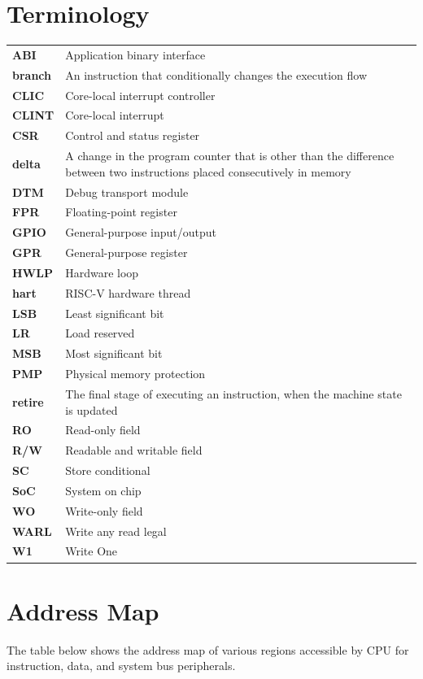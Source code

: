 \documentclass[main\_\_EN.tex]{subfiles}
\begin{document}
\section{Terminology}

\begin{longtable}[c]{ R{2cm} p{12cm} }
\textbf{ABI} & Application binary interface\\
\textbf{branch} & An instruction that conditionally changes the execution flow \\
\textbf{CLIC} & Core-local interrupt controller\\
\textbf{CLINT} & Core-local interrupt\\
\textbf{CSR} & Control and status register\\
\textbf{delta} & A change in the program counter that is other than the difference between two instructions placed consecutively in memory \\
\textbf{DTM} & Debug transport module \\
\textbf{FPR} & Floating-point register\\
\textbf{GPIO} & General-purpose input/output\\
\textbf{GPR} & General-purpose register\\
\textbf{HWLP} & Hardware loop\\
\textbf{hart} & RISC-V hardware thread \\
\textbf{LSB} & Least significant bit\\
\textbf{LR} & Load reserved\\
\textbf{MSB} & Most significant bit\\
\textbf{PMP} & Physical memory protection\\
\textbf{retire} & The final stage of executing an instruction, when the machine state is updated \\
\textbf{RO} & Read-only field\\
\textbf{R/W} & Readable and writable field\\
\textbf{SC} & Store conditional\\
\textbf{SoC} & System on chip\\
\textbf{WO} & Write-only field\\
\textbf{WARL} & Write any read legal\\
\textbf{W1} & Write One\\
\end{longtable}

\section{Address Map}
The table below shows the address map of various regions accessible by CPU for instruction, data, and system bus peripherals.
\end{document}
